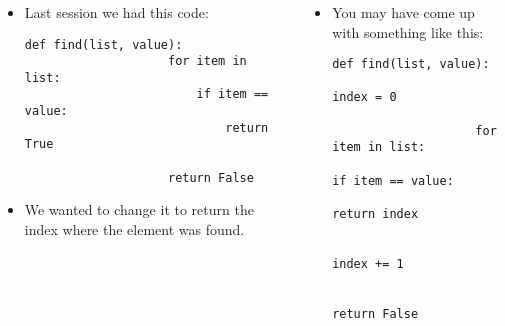 \documentclass[notes]{beamer}
\begin{document}
	\begin{frame}[fragile]
		\frametitle{}
		
		\begin{columns}[t]
			\begin{itemize}
				\item Last session we had this code:
				\begin{lstlisting}[xleftmargin=\dimexpr-\leftmargini, basicstyle=\scriptsize\tt]
				def find(list, value):
				    for item in list:
				        if item == value:
				            return True
				
				    return False
				\end{lstlisting}
				
				\item We wanted to change it to return the index where the element was found.
			\end{itemize}
			
			\pause
			
			\begin{itemize}
				\item You may have come up with something like this:
				\begin{lstlisting}[xleftmargin=\dimexpr-\leftmargini, basicstyle=\scriptsize\tt]
				def find(list, value):
				    index = 0
				
				    for item in list:
				        if item == value:
				            return index
				
				        index += 1
				
				    return False
				\end{lstlisting}
			\end{itemize}
		\end{columns}
	\end{frame}
	
\end{document}
